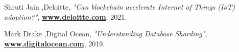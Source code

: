 \documentclass{article}
\let\oldhref\href
\renewcommand{\href}[2]{\oldhref{#1}{\bfseries#2}}
\begin{document}
\begin{thebibliography}{999}
    Shruti Jain ,Deloitte,
    \emph{"Can blockchain accelerate Internet of Things (IoT) adoption?"},
    \href{https://www2.deloitte.com/ch/en/pages/innovation/articles/blockchain-accelerate-iot-adoption.html}{www.deloitte.com},
    2021.

    Mark Drake ,Digital Ocean,
    \emph{"Understanding Database Sharding"},
    \href{https://www.digitalocean.com/community/tutorials/understanding-database-sharding}{www.digitalocean.com},
    2019.

\end{thebibliography}
\end{document}
